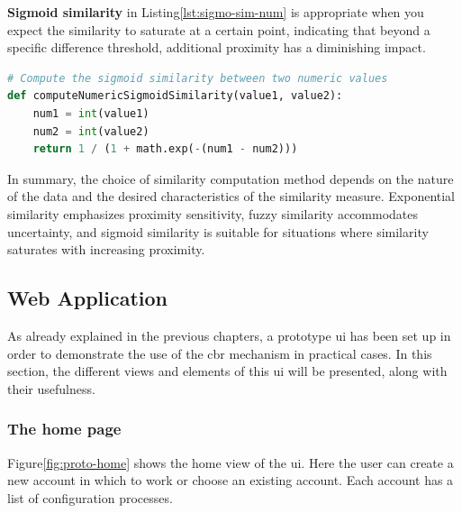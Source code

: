     
    \textbf{Sigmoid similarity} in Listing\ref{lst:sigmo-sim-num} is appropriate when you expect the similarity to saturate at a certain point, indicating that beyond a specific difference threshold, additional proximity has a diminishing impact.\\

\begin{lstlisting}[language=Python, caption=Function to compute the similarity value between two attributes, label={lst:sigmo-sim-num}]
# Compute the sigmoid similarity between two numeric values
def computeNumericSigmoidSimilarity(value1, value2):
    num1 = int(value1)
    num2 = int(value2)
    return 1 / (1 + math.exp(-(num1 - num2)))
\end{lstlisting}
        
In summary, the choice of similarity computation method depends on the nature of the data and the desired characteristics of the similarity measure. Exponential similarity emphasizes proximity sensitivity, fuzzy similarity accommodates uncertainty, and sigmoid similarity is suitable for situations where similarity saturates with increasing proximity.

\subsection{Web Application}
As already explained in the previous chapters, a prototype \acrshort{ui} has been set up in order to demonstrate the use of the \acrshort{cbr} mechanism in practical cases. In this section, the different views and elements of this \acrshort{ui} will be presented, along with their usefulness.

    \subsubsection{The home page}
    Figure\ref{fig:proto-home} shows the home view of the \acrshort{ui}. Here the user can create a new account in which to work or choose an existing account. Each account has a list of configuration processes.
    
